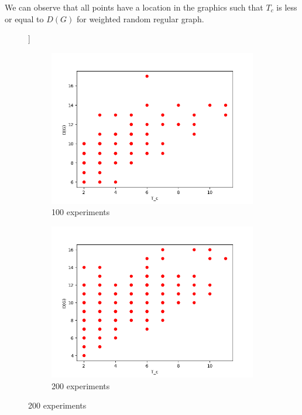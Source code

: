 \documentclass[a4paper,14pt]{llncs}
\begin{document}
We can observe that all points have a location in the graphics such that $T_c$ is less or equal to $D(G)$  for weighted random regular graph.
\begin{figure}[p]\label{pic:diagram}]
\begin{subfigure}{0.3\linewidth}
\centering\includegraphics[width=\linewidth]{images/100-consistency-convergence-weighted.png}
\caption{100 experiments}\label{pic:100-w}
\end{subfigure}
\begin{subfigure}{0.3\linewidth}
\centering\includegraphics[width=\linewidth]{images/200-consistency-convergence-weighted.png}
\caption{200 experiments}\label{pic:200-w}
\end{subfigure}

\end{figure}
\end{document}

